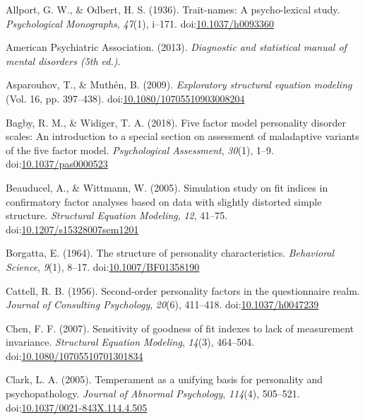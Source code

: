 \documentclass[man]{apa6}
\theoremstyle{definition}
\theoremstyle{definition}
\theoremstyle{definition}
\theoremstyle{remark}
\begin{document}
\begingroup
\setlength{\parindent}{-0.5in}
\setlength{\leftskip}{0.5in}

\hypertarget{refs}{}
\leavevmode\hypertarget{ref-AllportOdbert1936}{}%
Allport, G. W., \& Odbert, H. S. (1936). Trait-names: A psycho-lexical
study. \emph{Psychological Monographs}, \emph{47}(1), i--171.
doi:\href{https://doi.org/10.1037/h0093360}{10.1037/h0093360}

\leavevmode\hypertarget{ref-APA2013}{}%
American Psychiatric Association. (2013). \emph{Diagnostic and
statistical manual of mental disorders (5th ed.)}.

\leavevmode\hypertarget{ref-AsparouhovMuthen2009}{}%
Asparouhov, T., \& Muthén, B. (2009). \emph{Exploratory structural
equation modeling} (Vol. 16, pp. 397--438).
doi:\href{https://doi.org/10.1080/10705510903008204}{10.1080/10705510903008204}

\leavevmode\hypertarget{ref-Bagby2018}{}%
Bagby, R. M., \& Widiger, T. A. (2018). Five factor model personality
disorder scales: An introduction to a special section on assessment of
maladaptive variants of the five factor model. \emph{Psychological
Assessment}, \emph{30}(1), 1--9.
doi:\href{https://doi.org/10.1037/pas0000523}{10.1037/pas0000523}

\leavevmode\hypertarget{ref-Beauducel2005}{}%
Beauducel, A., \& Wittmann, W. (2005). Simulation study on fit indices
in confirmatory factor analyses based on data with slightly distorted
simple structure. \emph{Structural Equation Modeling}, \emph{12},
41--75.
doi:\href{https://doi.org/10.1207/s15328007sem1201}{10.1207/s15328007sem1201}

\leavevmode\hypertarget{ref-Borgatta1964}{}%
Borgatta, E. (1964). The structure of personality characteristics.
\emph{Behavioral Science}, \emph{9}(1), 8--17.
doi:\href{https://doi.org/10.1007/BF01358190}{10.1007/BF01358190}

\leavevmode\hypertarget{ref-Cattell1956}{}%
Cattell, R. B. (1956). Second-order personality factors in the
questionnaire realm. \emph{Journal of Consulting Psychology},
\emph{20}(6), 411--418.
doi:\href{https://doi.org/10.1037/h0047239}{10.1037/h0047239}

\leavevmode\hypertarget{ref-Chen2007}{}%
Chen, F. F. (2007). Sensitivity of goodness of fit indexes to lack of
measurement invariance. \emph{Structural Equation Modeling},
\emph{14}(3), 464--504.
doi:\href{https://doi.org/10.1080/10705510701301834}{10.1080/10705510701301834}

\leavevmode\hypertarget{ref-Clark2005}{}%
Clark, L. A. (2005). Temperament as a unifying basis for personality and
psychopathology. \emph{Journal of Abnormal Psychology}, \emph{114}(4),
505--521.
doi:\href{https://doi.org/10.1037/0021-843X.114.4.505}{10.1037/0021-843X.114.4.505}
\end{document}
